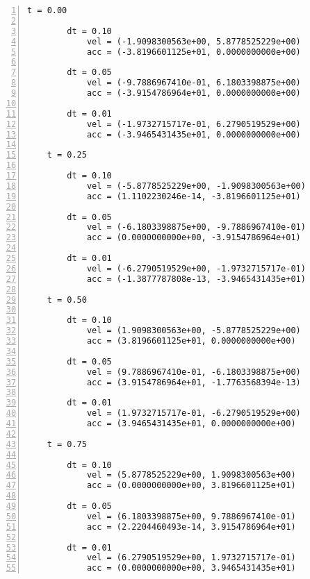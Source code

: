 \documentclass[12pt]{article}
\begin{document}
\begin{Verbatim}[fontfamily=courier, numbers=left, numbersep=2pt, fontsize=\small]
    t = 0.00

        dt = 0.10
            vel = (-1.9098300563e+00, 5.8778525229e+00)
            acc = (-3.8196601125e+01, 0.0000000000e+00)

        dt = 0.05
            vel = (-9.7886967410e-01, 6.1803398875e+00)
            acc = (-3.9154786964e+01, 0.0000000000e+00)

        dt = 0.01
            vel = (-1.9732715717e-01, 6.2790519529e+00)
            acc = (-3.9465431435e+01, 0.0000000000e+00)

    t = 0.25

        dt = 0.10
            vel = (-5.8778525229e+00, -1.9098300563e+00)
            acc = (1.1102230246e-14, -3.8196601125e+01)

        dt = 0.05
            vel = (-6.1803398875e+00, -9.7886967410e-01)
            acc = (0.0000000000e+00, -3.9154786964e+01)

        dt = 0.01
            vel = (-6.2790519529e+00, -1.9732715717e-01)
            acc = (-1.3877787808e-13, -3.9465431435e+01)

    t = 0.50

        dt = 0.10
            vel = (1.9098300563e+00, -5.8778525229e+00)
            acc = (3.8196601125e+01, 0.0000000000e+00)

        dt = 0.05
            vel = (9.7886967410e-01, -6.1803398875e+00)
            acc = (3.9154786964e+01, -1.7763568394e-13)

        dt = 0.01
            vel = (1.9732715717e-01, -6.2790519529e+00)
            acc = (3.9465431435e+01, 0.0000000000e+00)

    t = 0.75

        dt = 0.10
            vel = (5.8778525229e+00, 1.9098300563e+00)
            acc = (0.0000000000e+00, 3.8196601125e+01)

        dt = 0.05
            vel = (6.1803398875e+00, 9.7886967410e-01)
            acc = (2.2204460493e-14, 3.9154786964e+01)

        dt = 0.01
            vel = (6.2790519529e+00, 1.9732715717e-01)
            acc = (0.0000000000e+00, 3.9465431435e+01)
\end{Verbatim}
\end{document}
